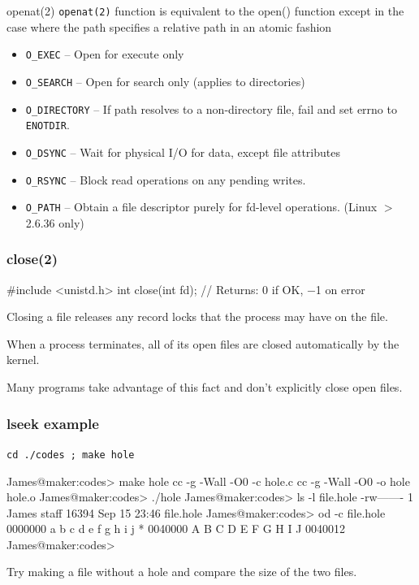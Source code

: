 \documentclass[newPxFont,sthlmFooter,nooffset]{beamer}
\begin{document}
\begin{frame}[t]{openat(2)}
\texttt{openat(2)} function is equivalent to the open() function except in the case where the path specifies a relative path in an atomic fashion
\bigskip


\begin{itemize}
	\item \texttt{O\_EXEC} -- Open for execute only
	\item \texttt{O\_SEARCH} -- Open for search only (applies to directories)
	\item \texttt{O\_DIRECTORY} -- If path resolves to a non-directory file, fail and set errno to \texttt{ENOTDIR}.
	\item \texttt{O\_DSYNC} -- Wait for physical I/O for data, except
file attributes
	\item \texttt{O\_RSYNC} -- Block read operations on any pending writes.
	\item \texttt{O\_PATH} -- Obtain a file descriptor purely for fd-level operations. (Linux $>$2.6.36 only)
\end{itemize}
\end{frame}

\begin{frame}[containsverbatim,t]
  \frametitle{close(2)}

\begin{codedef}
#include <unistd.h>
int close(int fd);   // Returns: 0 if OK, −1 on error
\end{codedef}

Closing a file releases any record locks that the process may have on the file.


When a process terminates, all of its open files are closed automatically by the kernel.
\bigskip

Many programs take advantage of this fact and don’t explicitly close open files.
\bigskip



\end{frame}

\begin{frame}[containsverbatim,t]
  \frametitle{lseek example}

\texttt{cd ./codes ; make hole}

\begin{codedef}
James@maker:codes> make hole
cc -g -Wall -O0 -c hole.c
cc -g -Wall -O0 -o hole hole.o
James@maker:codes> ./hole
James@maker:codes> ls -l file.hole
-rw-------  1 James  staff  16394 Sep 15 23:46 file.hole
James@maker:codes> od -c file.hole
0000000     a    b    c    d    e    f    g    h    i    j  \0  \0  \0  \0  \0     \0  \0  \0  \0  \0  \0  \0  \0  \0  \0  \0  \0  \0  \0  \0  \0
*
0040000    A   B   C   D   E   F   G   H   I   J
0040012
James@maker:codes>
\end{codedef}

\bigskip
Try making a file without a hole and compare the size of the two files.

\end{frame}
\end{document}
